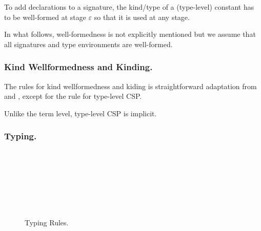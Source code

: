 To add declarations to a signature, the kind/type of a (type-level)
constant has to be well-formed at stage \(\varepsilon\) so that it is
used at any stage. 

In what follows, well-formedness is not explicitly mentioned but
we assume that all signatures and type environments are well-formed.

\subsubsection{Kind Wellformedness and Kinding.}

The rules for kind wellformedness and kiding is straightforward
adaptation from \LLF and \LTP, except for the rule for type-level CSP.
\begin{center}
\end{center}
Unlike the term level, type-level CSP is implicit.

\subsubsection{Typing.}

\begin{figure}[tbp]
  \begin{center}
     \hfil
     \\[2mm]
     \\[2mm]
     \\[2mm]
     \\[2mm]
     \andalso
     \\[2mm]
     \\[2mm]
     \andalso
    \caption{Typing Rules.}
    \label{fig:typing-rules}
  \end{center}
\end{figure}

